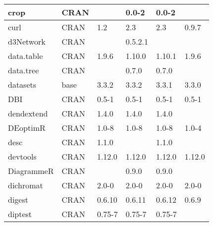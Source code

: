 \begin{longtable}{|llllll|}
crop                          & CRAN                      &             & 0.0-2       & 0.0-2          &                  \\ \hline
curl                          & CRAN                      & 1.2         & 2.3         & 2.3            & 0.9.7             \\ \hline \rowcolor{gray!25}
d3Network                     & CRAN                      &             & 0.5.2.1     &                &                  \\ \hline
data.table                    & CRAN                      & 1.9.6       & 1.10.0      & 1.10.1         & 1.9.6             \\ \hline \rowcolor{gray!25}
data.tree                     & CRAN                      &             & 0.7.0       & 0.7.0          &                  \\ \hline
datasets                      & base                      & 3.3.2       & 3.3.2       & 3.3.1          & 3.3.0             \\ \hline \rowcolor{gray!25}
DBI                           & CRAN                      & 0.5-1       & 0.5-1       & 0.5-1          & 0.5-1            \\ \hline
dendextend                    & CRAN                      & 1.4.0       & 1.4.0       & 1.4.0          &                   \\ \hline \rowcolor{gray!25}
DEoptimR                      & CRAN                      & 1.0-8       & 1.0-8       & 1.0-8          & 1.0-4            \\ \hline
desc                          & CRAN                      & 1.1.0       &             & 1.1.0          &                   \\ \hline \rowcolor{gray!25}
devtools                      & CRAN                      & 1.12.0      & 1.12.0      & 1.12.0         & 1.12.0           \\ \hline
DiagrammeR                    & CRAN                      &             & 0.9.0       & 0.9.0          &                   \\ \hline \rowcolor{gray!25}
dichromat                     & CRAN                      & 2.0-0       & 2.0-0       & 2.0-0          & 2.0-0            \\ \hline
digest                        & CRAN                      & 0.6.10      & 0.6.11      & 0.6.12         & 0.6.9             \\ \hline \rowcolor{gray!25}
diptest                       & CRAN                      & 0.75-7      & 0.75-7      & 0.75-7         &                  \\ \hline

\end{longtable}
